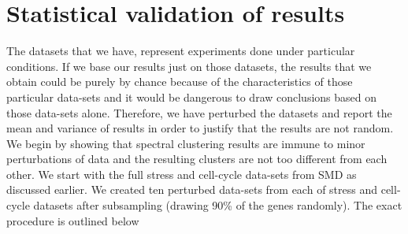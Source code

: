 \section{Statistical validation of results}
The datasets that we have, represent experiments done under particular conditions. If we base our results just on those datasets, the results that we obtain could be purely by chance because of the characteristics of those particular data-sets and it would be dangerous to draw conclusions based on those data-sets alone. 
Therefore, we have perturbed the datasets and report the mean and variance of results in order to justify that the results are not random. We begin by showing that spectral clustering results are immune to minor perturbations of data and the resulting clusters are not too different from each other. 
We start with the full stress and cell-cycle data-sets from SMD as discussed earlier. We created ten perturbed data-sets from each of stress and cell-cycle datasets after 
subsampling (drawing 90\% of the genes randomly). The exact procedure is outlined below

